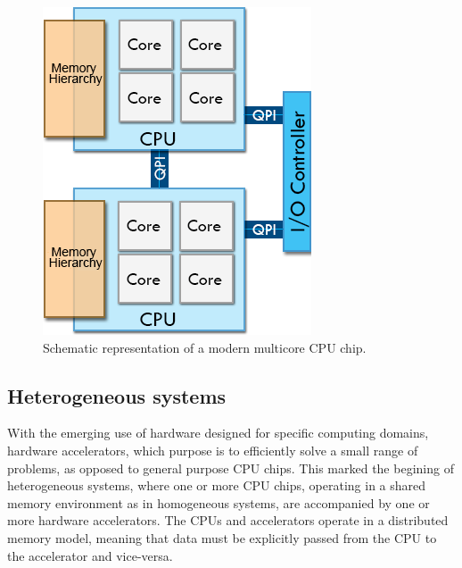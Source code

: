 \begin{figure}[!htp]
	\begin{center}
		\includegraphics[scale=0.5]{../../common/img/numa_qpi.png}
		\caption{Schematic representation of a modern multicore CPU chip.}
		\label{fig:CPUChip}
	\end{center}
\end{figure}

\subsection{Heterogeneous systems}
\label{HeterogeneousSystems}

With the emerging use of hardware designed for specific computing domains, hardware accelerators, which purpose is to efficiently solve a small range of problems, as opposed to general purpose CPU chips. This marked the begining of heterogeneous systems, where one or more CPU chips, operating in a shared memory environment as in homogeneous systems, are accompanied by one or more hardware accelerators. The CPUs and accelerators operate in a distributed memory model, meaning that data must be explicitly passed from the CPU to the accelerator and vice-versa.

